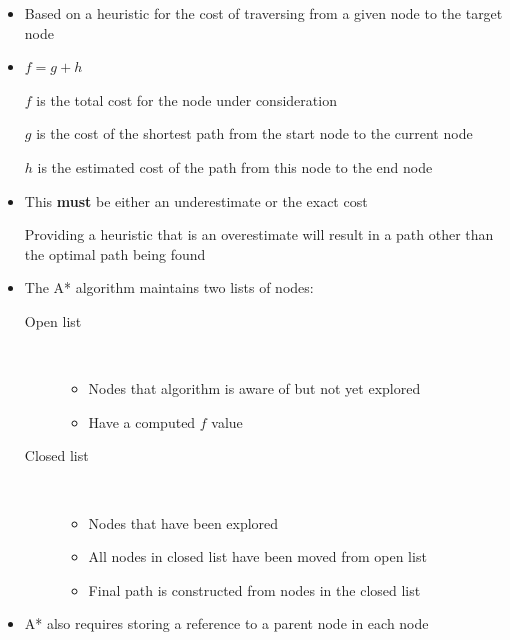 \documentclass[a4paper]{article}
\begin{document}
\begin{itemize}
  \item
    Based on a heuristic for the cost of traversing from a given node to the
    target node

  \item
    $f = g + h$

    $f$ is the total cost for the node under consideration

    $g$ is the cost of the shortest path from the start node to the current node

    $h$ is the estimated cost of the path from this node to the end node

  \item
    This \textbf{must} be either an underestimate or the exact cost

    Providing a heuristic that is an overestimate will result in a path other
    than the optimal path being found

  \item
    The A* algorithm maintains two lists of nodes:
    \begin{description}
      \item[Open list] \hfill \\
        \begin{itemize}
          \item
            Nodes that algorithm is aware of but not yet explored

          \item
            Have a computed $f$ value

        \end{itemize}

      \item[Closed list] \hfill \\
        \begin{itemize}
          \item
            Nodes that have been explored

          \item
            All nodes in closed list have been moved from open list

          \item
            Final path is constructed from nodes in the closed list

        \end{itemize}

    \end{description}

  \item
    A* also requires storing a reference to a parent node in each node


\end{itemize}
\end{document}

